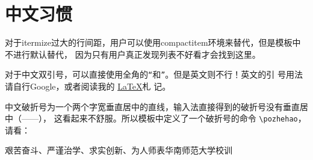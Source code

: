 \section{中文习惯}
\label{sec:chinese}

对于itermize过大的行间距，用户可以使用compactitem环境来替代，但是模板中不进行默认替代，
因为只有用户真正发现列表不好看才会找到这里。

对于中文双引号，可以直接使用全角的\verb|“|和\verb|”|。但是英文则不行！英文的引
号用法请自行Google，或者阅读我的
\href{https://dl.dropbox.com/u/49734213/LaTeX%E6%9C%AD%E8%AE%B0.pdf}{\LaTeX{}}札
记。

中文破折号为一个两个字宽垂直居中的直线，输入法直接得到的破折号没有垂直居中（——），
这看起来不舒服。所以模板中定义了一个破折号的命令 \verb|\pozhehao|，请看：

艰苦奋斗、严谨治学、求实创新、为人师表\hfill \pozhehao{}华南师范大学校训

